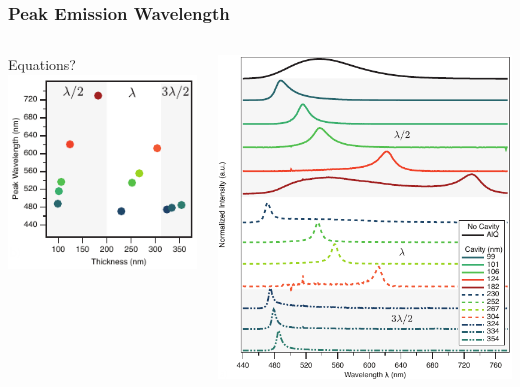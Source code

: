 \documentclass{beamer}
\begin{document}
        \begin{frame}
            \frametitle{Peak Emission Wavelength}
            \begin{columns}
                \begin{column}{0.4\textwidth}
					\centering
					Equations?
					\includegraphics[width=\textwidth]{images/n1_peak_emission.png}
                \end{column}
                \begin{column}{0.6\textwidth}
					\centering
					\includegraphics[width=\textwidth]{images/n1_spectra.png}

\end{column}
\end{columns}
\end{frame}
\end{document}
